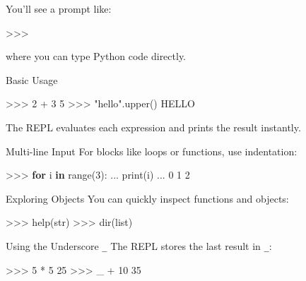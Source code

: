 \documentclass[
  letterpaper,
  DIV=11,
  numbers=noendperiod]{scrreprt}
\newenvironment{Shaded}{\begin{snugshade}}{\end{snugshade}}
\newcommand{\BuiltInTok}[1]{\textcolor[rgb]{0.00,0.23,0.31}{#1}}
\newcommand{\CommentTok}[1]{\textcolor[rgb]{0.37,0.37,0.37}{#1}}
\newcommand{\ControlFlowTok}[1]{\textcolor[rgb]{0.00,0.23,0.31}{\textbf{#1}}}
\newcommand{\DecValTok}[1]{\textcolor[rgb]{0.68,0.00,0.00}{#1}}
\newcommand{\KeywordTok}[1]{\textcolor[rgb]{0.00,0.23,0.31}{\textbf{#1}}}
\newcommand{\NormalTok}[1]{\textcolor[rgb]{0.00,0.23,0.31}{#1}}
\newcommand{\OperatorTok}[1]{\textcolor[rgb]{0.37,0.37,0.37}{#1}}
\newcommand{\StringTok}[1]{\textcolor[rgb]{0.13,0.47,0.30}{#1}}
\begin{document}
You'll see a prompt like:

\begin{Shaded}
\begin{Highlighting}[]
\OperatorTok{\textgreater{}\textgreater{}\textgreater{}}
\end{Highlighting}
\end{Shaded}

where you can type Python code directly.

Basic Usage

\begin{Shaded}
\begin{Highlighting}[]
\OperatorTok{\textgreater{}\textgreater{}\textgreater{}} \DecValTok{2} \OperatorTok{+} \DecValTok{3}
\DecValTok{5}
\OperatorTok{\textgreater{}\textgreater{}\textgreater{}} \StringTok{"hello"}\NormalTok{.upper()}
\CommentTok{\textquotesingle{}HELLO\textquotesingle{}}
\end{Highlighting}
\end{Shaded}

The REPL evaluates each expression and prints the result instantly.

Multi-line Input For blocks like loops or functions, use indentation:

\begin{Shaded}
\begin{Highlighting}[]
\OperatorTok{\textgreater{}\textgreater{}\textgreater{}} \ControlFlowTok{for}\NormalTok{ i }\KeywordTok{in} \BuiltInTok{range}\NormalTok{(}\DecValTok{3}\NormalTok{):}
\NormalTok{...     }\BuiltInTok{print}\NormalTok{(i)}
\NormalTok{...}
\DecValTok{0}
\DecValTok{1}
\DecValTok{2}
\end{Highlighting}
\end{Shaded}

Exploring Objects You can quickly inspect functions and objects:

\begin{Shaded}
\begin{Highlighting}[]
\OperatorTok{\textgreater{}\textgreater{}\textgreater{}} \BuiltInTok{help}\NormalTok{(}\BuiltInTok{str}\NormalTok{)}
\OperatorTok{\textgreater{}\textgreater{}\textgreater{}} \BuiltInTok{dir}\NormalTok{(}\BuiltInTok{list}\NormalTok{)}
\end{Highlighting}
\end{Shaded}

Using the Underscore \texttt{\_} The REPL stores the last result in
\texttt{\_}:

\begin{Shaded}
\begin{Highlighting}[]
\OperatorTok{\textgreater{}\textgreater{}\textgreater{}} \DecValTok{5} \OperatorTok{*} \DecValTok{5}
\DecValTok{25}
\OperatorTok{\textgreater{}\textgreater{}\textgreater{}}\NormalTok{ \_ }\OperatorTok{+} \DecValTok{10}
\DecValTok{35}
\end{Highlighting}
\end{Shaded}
\end{document}
